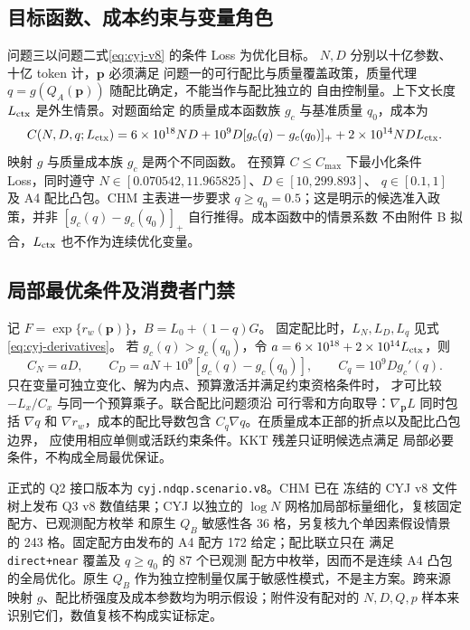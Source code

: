\subsection{目标函数、成本约束与变量角色}

问题三以问题二式\eqref{eq:cyj-v8} 的条件 Loss 为优化目标。
$N,D$ 分别以十亿参数、十亿 token 计，$\boldsymbol p$ 必须满足
问题一的可行配比与质量覆盖政策，质量代理
$q=g(Q_A(\boldsymbol p))$ 随配比确定，不能当作与配比独立的
自由控制量。上下文长度 $L_{\rm ctx}$ 是外生情景。对题面给定
的质量成本函数族 $g_c$ 与基准质量 $q_0$，成本为
\begin{equation}\label{eq:cyj-q3-cost}
C(N,D,q;L_{\rm ctx})=6\times10^{18}ND
+10^{9}D[g_c(q)-g_c(q_0)]_+
+2\times10^{14}NDL_{\rm ctx}.
\end{equation}
映射 $g$ 与质量成本族 $g_c$ 是两个不同函数。
在预算 $C\leq C_{\max}$ 下最小化条件 Loss，同时遵守
$N\in[0.070542,11.965825]$、$D\in[10,299.893]$、
$q\in[0.1,1]$ 及 A4 配比凸包。CHM 主表进一步要求
$q\geq q_0=0.5$；这是明示的候选准入政策，并非
$[g_c(q)-g_c(q_0)]_+$ 自行推得。成本函数中的情景系数
不由附件 B 拟合，$L_{\rm ctx}$ 也不作为连续优化变量。

\subsection{局部最优条件及消费者门禁}

记 $F=\exp\{r_w(\boldsymbol p)\}$，$B=L_0+(1-q)G$。
固定配比时，$L_N,L_D,L_q$ 见式\eqref{eq:cyj-derivatives}。
若 $g_c(q)>g_c(q_0)$，令
$a=6\times10^{18}+2\times10^{14}L_{\rm ctx}$，则
\begin{equation}
C_N=aD,\qquad C_D=aN+10^9[g_c(q)-g_c(q_0)],\qquad
C_q=10^9Dg_c'(q).
\end{equation}
只在变量可独立变化、解为内点、预算激活并满足约束资格条件时，
才可比较 $-L_x/C_x$ 与同一个预算乘子。联合配比问题须沿
可行零和方向取导：$\nabla_{\boldsymbol p}L$ 同时包括
$\nabla q$ 和 $\nabla r_w$，成本的配比导数包含
$C_q\nabla q$。在质量成本正部的折点以及配比凸包边界，
应使用相应单侧或活跃约束条件。KKT 残差只证明候选点满足
局部必要条件，不构成全局最优保证。

正式的 Q2 接口版本为 \texttt{cyj.ndqp.scenario.v8}。CHM 已在
冻结的 CYJ v8 文件树上发布 Q3 v8 数值结果；CYJ 以独立的
$\log N$ 网格加局部标量细化，复核固定配方、已观测配方枚举
和原生 $Q_B$ 敏感性各 36 格，另复核九个单因素假设情景的
243 格。固定配方由发布的 A4 配方 172 给定；配比联立只在
满足 \texttt{direct+near} 覆盖及 $q\geq q_0$ 的 87 个已观测
配方中枚举，因而不是连续 A4 凸包的全局优化。原生 $Q_B$
作为独立控制量仅属于敏感性模式，不是主方案。跨来源映射
$g$、配比桥强度及成本参数均为明示假设；附件没有配对的
$N,D,Q,p$ 样本来识别它们，数值复核不构成实证标定。
